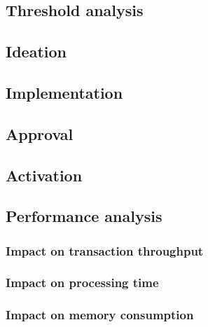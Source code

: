 \documentclass[11pt,a4paper]{article}
\begin{document}
\subsection{Threshold analysis}
\label{sec:threshold-analysis}


\subsection{Ideation}
\label{sec:ideation}

\subsection{Implementation}
\label{sec:implementation}

\subsection{Approval}
\label{sec:approval}

\subsection{Activation}
\label{sec:activation}


\subsection{Performance analysis}
\label{sec:performance-analysis}

\subsubsection{Impact on transaction throughput}
\label{sec:impact-trans-thro}

\subsubsection{Impact on processing time}
\label{sec:impact-proc-time}

\subsubsection{Impact on memory consumption}
\label{sec:impact-memory-cons}
\end{document}

